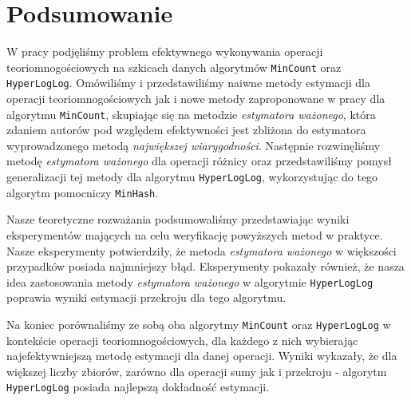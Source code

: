 \chapter{Podsumowanie}
\thispagestyle{chapterBeginStyle}

W pracy podjęliśmy problem
efektywnego wykonywania operacji teoriomnogościowych na szkicach danych algorytmów \texttt{MinCount} oraz \texttt{HyperLogLog}.
Omówiliśmy i przedstawiliśmy naiwne metody estymacji dla operacji teoriomnogościowych jak i nowe metody zaproponowane w pracy \cite{ting} dla algorytmu \texttt{MinCount}, skupiając się na metodzie \textit{estymatora ważonego}, która zdaniem autorów pod względem efektywności jest zbliżona do estymatora wyprowadzonego metodą \textit{największej wiarygodności}. Następnie rozwinęliśmy 
metodę
\textit{estymatora ważonego} dla operacji różnicy oraz przedstawiliśmy pomysł generalizacji tej metody dla algorytmu \texttt{HyperLogLog}, wykorzystując do tego algorytm pomocniczy \texttt{MinHash}.

Nasze teoretyczne rozważania podsumowaliśmy przedstawiając wyniki eksperymentów mających na celu weryfikację powyższych metod w praktyce. Nasze eksperymenty potwierdziły, że metoda \textit{estymatora ważonego} w większości przypadków posiada najmniejszy błąd. Eksperymenty pokazały również, że nasza idea zastosowania metody \textit{estymatora ważonego} w algorytmie \texttt{HyperLogLog} poprawia wyniki estymacji przekroju dla tego algorytmu.

Na koniec porównaliśmy ze sobą oba algorytmy \texttt{MinCount} oraz \texttt{HyperLogLog} w kontekście operacji teoriomnogościowych, dla każdego z nich wybierając najefektywniejszą metodę estymacji dla danej operacji. Wyniki wykazały, że dla większej liczby zbiorów, zarówno dla operacji sumy jak i przekroju - algorytm \texttt{HyperLogLog} posiada najlepszą dokładność estymacji.



